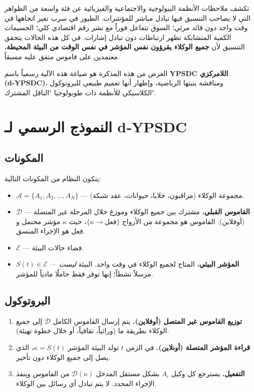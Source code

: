 \documentclass[11pt,a4paper]{article}
\begin{document}
	تكشف ملاحظات الأنظمة البيولوجية والاجتماعية والفيزيائية عن فئة واسعة من الظواهر التي لا يصاحب التنسيق فيها تبادل مباشر للمؤشرات. الطيور في سرب تغير اتجاهها في وقت واحد دون قائد مرئي؛ السوق تتفاعل فوراً مع نشر رقم اقتصادي كلي؛ الجسيمات الكمية المتشابكة تظهر ارتباطات دون تبادل إشارات. في كل هذه الحالات يتحقق التنسيق لأن \textbf{جميع الوكلاء يقرؤون نفس المؤشر في نفس الوقت من البيئة المحيطة}، معتمدين على قاموس متفق عليه مسبقاً.
	
	الغرض من هذه المذكرة هو صياغة هذه الآلية رسمياً باسم \textbf{YPSDC اللامركزي (d‑YPSDC)}، ومناقشة بنيتها الرياضية، وإظهار أنها تعميم طبيعي للبروتوكول الكلاسيكي للأنظمة ذات طوبولوجيا "الناقل المشترك".
	
	\section{النموذج الرسمي لـ d‑YPSDC}
	
	\subsection{المكونات}
	
	يتكون النظام من المكونات التالية:
	
	\begin{itemize}[leftmargin=*]
		\item \(\mathcal{A} = \{A_1, A_2, \dots, A_N\}\) — مجموعة الوكلاء (مراقبون، خلايا، حيوانات، عقد شبكة).
		\item \(\mathcal{D}\) — \textbf{القاموس القبلي}، مشترك بين جميع الوكلاء وموزع خلال المرحلة غير المتصلة (أوفلاين). القاموس هو مجموعة من الأزواج \(\{ \kappa \to \text{فعل} \}\)، حيث \(\kappa\) مؤشر محتمل و\(\text{فعل}\) هو الإجراء المنسق.
		\item \(\mathcal{E}\) — فضاء حالات البيئة.
		\item \(S(t) \in \mathcal{E}\) — \textbf{المؤشر البيئي}، المتاح لجميع الوكلاء في وقت واحد. البيئة \emph{ليست} مرسلاً نشطاً؛ إنها توفر فقط حاملًا مادياً للمؤشر.
	\end{itemize}
	
	\subsection{البروتوكول}
	
	\begin{enumerate}[leftmargin=*, label=\textbf{المرحلة \arabic*:}]
		\item \textbf{توزيع القاموس غير المتصل (أوفلاين).} يتم إرسال القاموس الكامل \(\mathcal{D}\) إلى جميع الوكلاء بطريقة ما (وراثياً، ثقافياً، أو خلال خطوة تهيئة).
		\item \textbf{قراءة المؤشر المتصلة (أونلاين).} في الزمن \(t\) تولد البيئة المؤشر \(\kappa = S(t)\)، الذي يصل إلى جميع الوكلاء دون تأخير.
		\item \textbf{التفعيل.} يسترجع كل وكيل \(A_i\) بشكل مستقل المدخل \(\mathcal{D}(\kappa)\) من القاموس وينفذ الإجراء المحدد. لا يتم تبادل أي رسائل بين الوكلاء.
	\end{enumerate}
	
\end{document}
